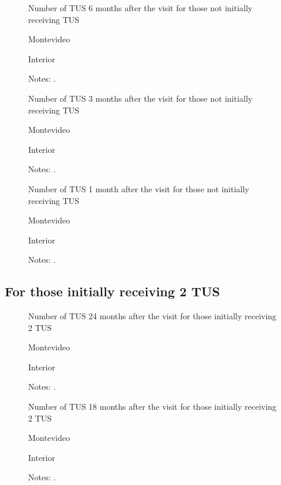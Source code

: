 \documentclass[12pt]{article}
\begin{document}
\begin{figure}[H]%
	\caption{Number of TUS 6 months after the visit for those not initially receiving TUS}%
	\centering
	\caption*{ {Montevideo}}
	\qquad
	\caption*{Interior}
	\label{fig:first_stage_si1Tus_tus6}%
	\caption*{ {\footnotesize Notes: .}}
\end{figure}

\begin{figure}[H]%
	\caption{Number of TUS 3 months after the visit for those not initially receiving TUS}%
	\centering
	\caption*{ {Montevideo}}
	\qquad
	\caption*{Interior}
	\label{fig:first_stage_si1Tus_tus3}%
	\caption*{ {\footnotesize Notes: .}}
\end{figure}

\begin{figure}[H]%
	\caption{Number of TUS 1 month after the visit for those not initially receiving TUS}%
	\centering
	\caption*{ {Montevideo}}
	\qquad
	\caption*{Interior}
	\label{fig:first_stage_si1Tus_tus1}%
	\caption*{ {\footnotesize Notes: .}}
\end{figure}

\subsection{For those initially receiving 2 TUS}

\begin{figure}[H]%
	\caption{Number of TUS 24 months after the visit for those initially receiving 2 TUS}%
	\centering
	\caption*{ {Montevideo}}
	\qquad
	\caption*{Interior}
	\label{fig:first_stage_si2Tus_tus24}%
	\caption*{ {\footnotesize Notes: .}}
\end{figure}

\begin{figure}[H]%
	\caption{Number of TUS 18 months after the visit for those initially receiving 2 TUS}%
	\centering
	\caption*{ {Montevideo}}
	\qquad
	\caption*{Interior}
	\label{fig:first_stage_si2Tus_tus18}%
	\caption*{ {\footnotesize Notes: .}}
\end{figure}
\end{document}
